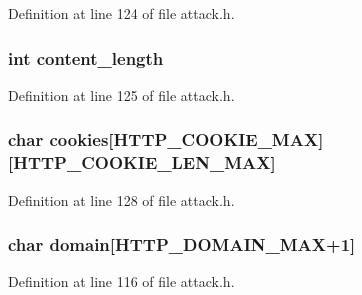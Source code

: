 Definition at line 124 of file attack.\+h.

\subsubsection[{\texorpdfstring{content\+\_\+length}{content_length}}]{\setlength{\rightskip}{0pt plus 5cm}int content\+\_\+length}\hypertarget{structattack__http__state_a675a47f46ecd9d8ec01c738e04c28cbe}{}\label{structattack__http__state_a675a47f46ecd9d8ec01c738e04c28cbe}


Definition at line 125 of file attack.\+h.

\subsubsection[{\texorpdfstring{cookies}{cookies}}]{\setlength{\rightskip}{0pt plus 5cm}char cookies\mbox{[}{\bf H\+T\+T\+P\+\_\+\+C\+O\+O\+K\+I\+E\+\_\+\+M\+AX}\mbox{]}\mbox{[}{\bf H\+T\+T\+P\+\_\+\+C\+O\+O\+K\+I\+E\+\_\+\+L\+E\+N\+\_\+\+M\+AX}\mbox{]}}\hypertarget{structattack__http__state_a5748f13b817aec88794a184c67b44863}{}\label{structattack__http__state_a5748f13b817aec88794a184c67b44863}


Definition at line 128 of file attack.\+h.

\subsubsection[{\texorpdfstring{domain}{domain}}]{\setlength{\rightskip}{0pt plus 5cm}char domain\mbox{[}{\bf H\+T\+T\+P\+\_\+\+D\+O\+M\+A\+I\+N\+\_\+\+M\+AX}+1\mbox{]}}\hypertarget{structattack__http__state_a68d155fe5b39db18852b16d2fdaf1edc}{}\label{structattack__http__state_a68d155fe5b39db18852b16d2fdaf1edc}


Definition at line 116 of file attack.\+h.

